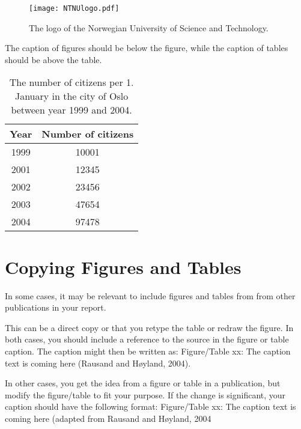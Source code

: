 \begin{figure}[htbp]
    \centering
    \texttt{[image: NTNUlogo.pdf]}
    \caption{The logo of the Norwegian University of Science and Technology.}
    \label{fig:NTNUlogo}
\end{figure}

The caption of figures should be below the figure, while the caption of tables should be above the table.

\begin{table}[htbp]
    \centering
    \caption{The number of citizens per 1. January in the city of Oslo between year 1999 and 2004.}
    \begin{tabular}{cc}
    \hline
    \textbf{Year}   &  \textbf{Number of citizens}  \\
    \hline
    1999            &  10001                        \\
    2001            &  12345                        \\
    2002            &  23456                        \\
    2003            &  47654                        \\
    2004            &  97478                        \\
    \hline
    \end{tabular}
    \label{tab:my_label}
\end{table}

\section{Copying Figures and Tables}
In some cases, it may be relevant to include figures and tables from from other publications in your report. 

This can be a direct copy or that you retype the table or redraw the figure. In both cases, you should include a reference to the source in the figure or table caption. The caption might then be written as: Figure/Table xx: The caption text is coming here (Rausand and Høyland, 2004).

In other cases, you get the idea from a figure or table in a publication, but modify the figure/table to fit your purpose. If the change is significant, your caption should have the following format: Figure/Table xx: The caption text is coming here (adapted from Rausand and Høyland, 2004

